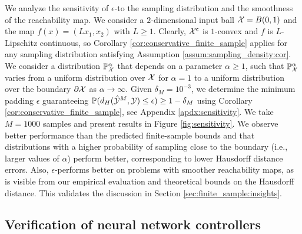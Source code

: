 \documentclass[12pt]{l4dc2022} %
\begin{document}
	We analyze the sensitivity of $\epsilon$-\randup  to the sampling distribution and the smoothness of the reachability map. 
	We consider a $2$-dimensional input ball $\mathcal{X}=B(0,1)$ and the map $f(x)=(Lx_1,x_2)$ with $L\geq 1$. Clearly, $\mathcal{X}^{\mathsf{c}}$ is $1$-convex and $f$ is $L$-Lipschitz continuous, so %
% 
	Corollary \ref{cor:conservative_finite_sample} applies for any sampling distribution satisfying Assumption \ref{assum:sampling_density:cor}. 
We consider a distribution $\mathbb{P}_{\mathcal{X}}^\alpha$ that depends on a parameter $\alpha\geq 1$, such that $\mathbb{P}_{\mathcal{X}}^\alpha$ varies from a uniform distribution over $\mathcal{X}$ for $\alpha=1$ to a uniform distribution over the boundary $\partial\mathcal{X}$ as $\alpha\rightarrow\infty$. Given $\delta_M=10^{-3}$, we determine the minimum padding $\epsilon$ guaranteeing $\mathbb{P}(
d_H(
\hat{\mathcal{Y}}^M, 
\mathcal{Y}
)\leq \epsilon
)\geq 1-\delta_M$ using Corollary \ref{cor:conservative_finite_sample}, see Appendix \ref{apdx:sensitivity}. 
We take $M=1000$ samples and present results in Figure \ref{fig:sensitivity}. 
We observe better performance than the predicted finite-sample bounds 
% 
and that distributions with a higher probability of sampling close to the boundary %
(i.e., larger values of $\alpha$) perform better, corresponding to lower Hausdorff distance errors. 
Also, $\epsilon$-\randup performs better on problems with smoother reachability maps, %
as is visible from our empirical evaluation and theoretical bounds on the Hausdorff distance.  This validates the discussion in Section \ref{sec:finite_sample:insights}.
    
% 
% 
% 
    
\vspace{-2mm}
    
\subsection{Verification of neural network controllers}\label{sec:results:verif_closed_nn}
\end{document}
